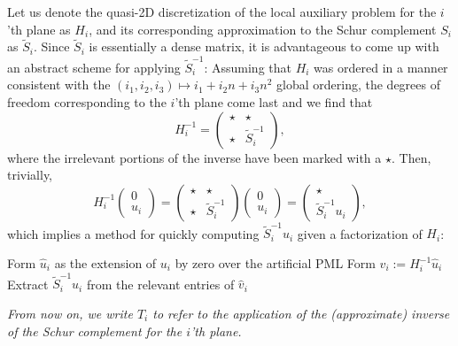Let us denote the quasi-2D discretization of the local auxiliary problem for
the $i$'th plane as $H_i$, and its corresponding approximation to the Schur 
complement $S_i$ as $\tilde S_i$. Since $\tilde S_i$ is essentially a dense 
matrix, it is advantageous to come up with 
an abstract scheme for applying $\tilde S_i^{-1}$: Assuming that $H_i$ was 
ordered in a manner consistent with the 
$(i_1,i_2,i_3) \mapsto i_1+i_2 n+i_3 n^2$ global ordering, the degrees of 
freedom corresponding to the $i$'th plane come last and we find that
\begin{equation}
  H_i^{-1}=\left(\begin{array}{cc} \star & \star \\ \star & \tilde S_i^{-1}
           \end{array}\right),
\end{equation}
where the irrelevant portions of the inverse have been marked with a $\star$.
Then, trivially,
\begin{equation}
  H_i^{-1} \left(\begin{array}{c}0\\ u_i\end{array}\right)= 
  \left(\begin{array}{cc}\star &\star\\ \star &\tilde S_i^{-1}\end{array}\right)
  \left(\begin{array}{c}0\\ u_i\end{array}\right)= 
  \left(\begin{array}{c}\star\\ \tilde S_i^{-1}u_i\end{array}\right),
\end{equation}
which implies a method for quickly computing $\tilde S_i^{-1} u_i$ given 
a factorization of $H_i$:

\begin{algorithm2e}
\DontPrintSemicolon
Form $\hat u_i$ as the extension of $u_i$ by zero over the artificial PML\;
Form $\hat v_i := H_i^{-1} \hat u_i$\;
Extract $\tilde S_i^{-1} u_i$ from the relevant entries of $\hat v_i$\;
\caption{Application of $\tilde S_i^{-1}$ to $u_i$ given a multifrontal
factorization of $H_i$. $O(\gamma^2 n^2 \log n)$ work is required.}
\label{alg:apply-inverse}
\end{algorithm2e}
{\em From now on, we write $T_i$ to refer to the application of the 
(approximate) inverse of the Schur complement for the $i$'th plane.} 

